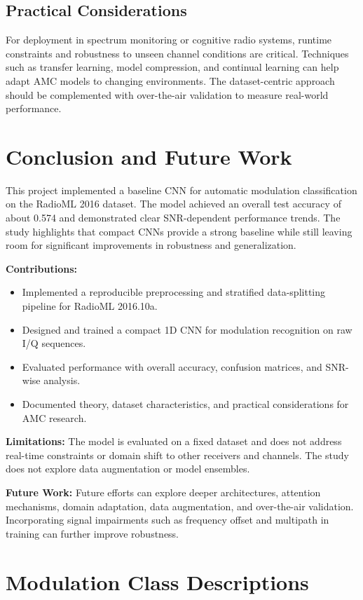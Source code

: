 \documentclass[12pt,a4paper]{report}
\begin{document}
\section{Practical Considerations}
For deployment in spectrum monitoring or cognitive radio systems, runtime constraints and robustness to unseen channel conditions are critical. Techniques such as transfer learning, model compression, and continual learning can help adapt AMC models to changing environments. The dataset-centric approach should be complemented with over-the-air validation to measure real-world performance.

\chapter{Conclusion and Future Work}
This project implemented a baseline CNN for automatic modulation classification on the RadioML 2016 dataset. The model achieved an overall test accuracy of about 0.574 and demonstrated clear SNR-dependent performance trends. The study highlights that compact CNNs provide a strong baseline while still leaving room for significant improvements in robustness and generalization.

\textbf{Contributions:}
\begin{itemize}
    \item Implemented a reproducible preprocessing and stratified data-splitting pipeline for RadioML 2016.10a.
    \item Designed and trained a compact 1D CNN for modulation recognition on raw I/Q sequences.
    \item Evaluated performance with overall accuracy, confusion matrices, and SNR-wise analysis.
    \item Documented theory, dataset characteristics, and practical considerations for AMC research.
\end{itemize}

\textbf{Limitations:} The model is evaluated on a fixed dataset and does not address real-time constraints or domain shift to other receivers and channels. The study does not explore data augmentation or model ensembles.

\textbf{Future Work:} Future efforts can explore deeper architectures, attention mechanisms, domain adaptation, data augmentation, and over-the-air validation. Incorporating signal impairments such as frequency offset and multipath in training can further improve robustness.

\appendix
\chapter{Modulation Class Descriptions}
\end{document}
